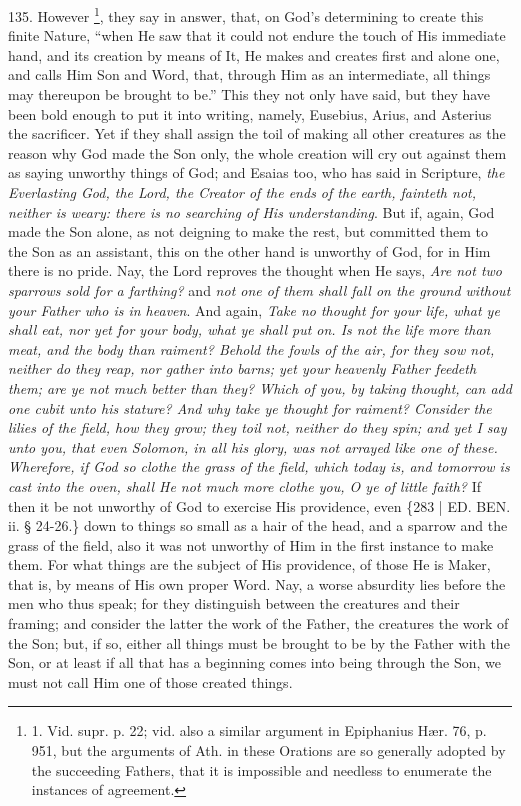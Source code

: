 135. However \footnote{

1. Vid. supr. p. 22; vid. also
a similar argument in Epiphanius Hær. 76, p. 951, but the arguments
of Ath. in these Orations are so generally adopted by the succeeding
Fathers, that it is impossible and needless to enumerate the instances
of agreement.}, they say in answer, that, on God's determining to create
this finite Nature, ``when He saw that it could not endure the touch of
His immediate hand, and its creation by means of It, He makes and
creates first and alone one, and calls Him Son and Word, that, through
Him as an intermediate, all things may thereupon be brought to be.''
This they not only have said, but they have been bold enough to put it
into writing, namely, Eusebius, Arius, and Asterius the sacrificer.
Yet if they shall assign the toil of making all other creatures as the
reason why God made the Son only, the whole creation will cry out
against them as saying unworthy things of God; and Esaias too, who has
said in Scripture, \emph{the Everlasting God, the Lord, the Creator of
the ends of the earth, fainteth not, neither is weary: there is no
searching of His understanding}. But if, again, God made the Son
alone, as not deigning to make the rest, but committed them to the Son
as an assistant, this on the other hand is unworthy of God, for in Him
there is no pride. Nay, the Lord reproves the thought when He says, \emph{Are
not two sparrows sold for a farthing?} and \emph{not one of them shall
fall on the ground without your Father who is in heaven}. And
again, \emph{Take no thought for your life, what ye shall eat, nor yet
for your body, what ye shall put on. Is not the life more than meat,
and the body than raiment? Behold the fowls of the air, for they sow
not, neither do they reap, nor gather into barns; yet your heavenly
Father feedeth them; are ye not much better than they? Which of you,
by taking thought, can add one cubit unto his stature? And why take ye
thought for raiment? Consider the lilies of the field, how they grow;
they toil not, neither do they spin; and yet I say unto you, that even
Solomon, in all his glory, was not arrayed like one of these.
Wherefore, if God so clothe the grass of the field, which today is,
and tomorrow is cast into the oven, shall He not much more clothe you,
O ye of little faith?} If then it be not unworthy of God to
exercise His providence, even \{283 | ED.
BEN. ii. § 24-26.\} down to things so small as a
hair of the head, and a sparrow and the grass of the field, also it
was not unworthy of Him in the first instance to make them. For what
things are the subject of His providence, of those He is Maker, that
is, by means of His own proper Word. Nay, a worse absurdity lies
before the men who thus speak; for they distinguish between the
creatures and their framing; and consider the latter the work of the
Father, the creatures the work of the Son; but, if so, either all
things must be brought to be by the Father with the Son, or at least
if all that has a beginning comes into being through the Son, we must
not call Him one of those created things.

